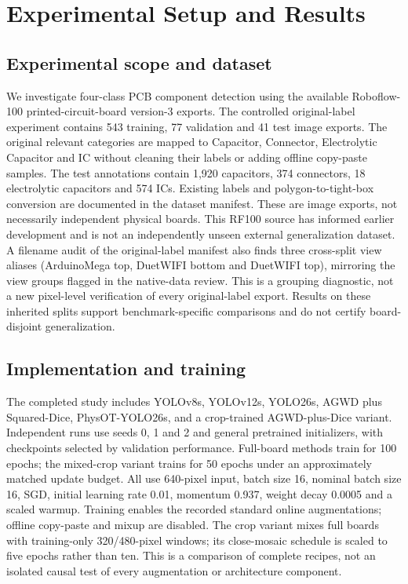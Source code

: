 \section{Experimental Setup and Results}

\subsection{Experimental scope and dataset}

We investigate four-class PCB component detection using the available
Roboflow-100 printed-circuit-board version-3 exports. The controlled
original-label experiment contains 543 training, 77 validation and 41 test image
exports. The original relevant categories are mapped to Capacitor, Connector,
Electrolytic Capacitor and IC without cleaning their labels or adding offline
copy-paste samples. The test annotations contain 1,920 capacitors, 374
connectors, 18 electrolytic capacitors and 574 ICs. Existing labels and
polygon-to-tight-box conversion are documented in the dataset manifest.
These are image exports, not necessarily independent physical boards. This
RF100 source has informed earlier development and is not an independently
unseen external generalization dataset. A filename audit of the original-label
manifest also finds three cross-split view aliases (ArduinoMega top, DuetWIFI
bottom and DuetWIFI top), mirroring the view groups flagged in the native-data
review. This is a grouping diagnostic, not a new pixel-level verification of
every original-label export. Results on these inherited splits support
benchmark-specific comparisons and do not certify board-disjoint generalization.

\subsection{Implementation and training}

The completed study includes YOLOv8s, YOLOv12s, YOLO26s, AGWD plus Squared-Dice,
PhysOT-YOLO26s, and a crop-trained AGWD-plus-Dice variant. Independent runs use
seeds 0, 1 and 2 and general pretrained initializers, with checkpoints selected
by validation performance. Full-board methods train for 100 epochs; the
mixed-crop variant trains for 50 epochs under an approximately matched update
budget. All use 640-pixel input, batch size 16, nominal batch size 16, SGD,
initial learning rate 0.01, momentum 0.937, weight decay 0.0005 and a scaled
warmup. Training enables the recorded standard online augmentations; offline
copy-paste and mixup are disabled. The crop variant mixes full boards with
training-only 320/480-pixel windows; its close-mosaic schedule is scaled to five
epochs rather than ten. This is a comparison of complete recipes, not an
isolated causal test of every augmentation or architecture component.

